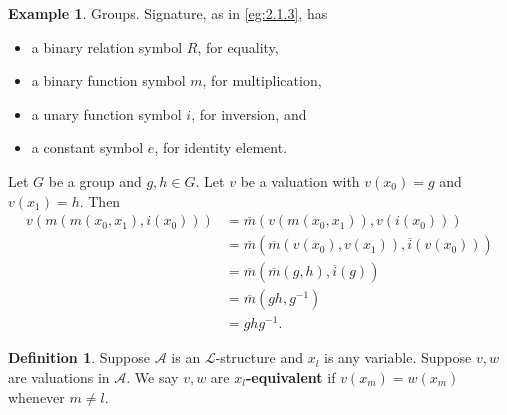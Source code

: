 \documentclass{article}
\newcommand{\A}{\mathcal{A}}
\renewcommand{\L}{\mathcal{L}}
\newcommand{\rb}[1]{\left( #1 \right)}
\theoremstyle{definition}\newtheorem{definition}{Definition}[subsection]
\theoremstyle{definition}\newtheorem{remark1}[definition]{Remark}
\theoremstyle{definition}\newtheorem{example1}[definition]{Example}
\theoremstyle{definition}\newtheorem*{remark2}{Remark}
\theoremstyle{definition}\newtheorem*{example2}{Example}
\theoremstyle{definition}\newtheorem*{note}{Note}
\theoremstyle{definition}\newtheorem*{notation}{Notation}
\begin{document}
\begin{example2}
Groups. Signature, as in \ref{eg:2.1.3}, has
\begin{itemize}
\item a binary relation symbol $ R $, for equality,
\item a binary function symbol $ m $, for multiplication,
\item a unary function symbol $ i $, for inversion, and
\item a constant symbol $ e $, for identity element.
\end{itemize}
Let $ G $ be a group and $ g, h \in G $. Let $ v $ be a valuation with $ v\rb{x_0} = g $ and $ v\rb{x_1} = h $. Then
\begin{align*}
v\rb{m\rb{m\rb{x_0, x_1}, i\rb{x_0}}}
& = \overline{m}\rb{v\rb{m\rb{x_0, x_1}}, v\rb{i\rb{x_0}}} \\
& = \overline{m}\rb{\overline{m}\rb{v\rb{x_0}, v\rb{x_1}}, \overline{i}\rb{v\rb{x_0}}} \\
& = \overline{m}\rb{\overline{m}\rb{g, h}, \overline{i}\rb{g}} \\
& = \overline{m}\rb{gh, g^{-1}} \\
& = ghg^{-1}.
\end{align*}
\end{example2}

\begin{definition}
Suppose $ \A $ is an $ \L $-structure and $ x_l $ is any variable. Suppose $ v, w $ are valuations in $ \A $. We say $ v, w $ are \textbf{$ x_l $-equivalent} if $ v\rb{x_m} = w\rb{x_m} $ whenever $ m \ne l $.
\end{definition}

\pagebreak
\end{document}
